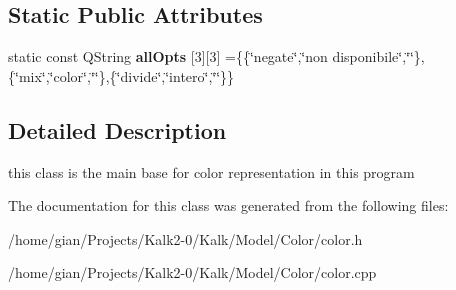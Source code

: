 \subsection*{Static Public Attributes}
\begin{DoxyCompactItemize}
\item 
\mbox{\label{class_color_af49cd7836a808e9e36408f996ea3ce0e}} 
static const Q\+String {\bfseries all\+Opts} \mbox{[}3\mbox{]}\mbox{[}3\mbox{]} =\{\{\char`\"{}negate\char`\"{},\char`\"{}non disponibile\char`\"{},\char`\"{}\char`\"{}\},\{\char`\"{}mix\char`\"{},\char`\"{}color\char`\"{},\char`\"{}\char`\"{}\},\{\char`\"{}divide\char`\"{},\char`\"{}intero\char`\"{},\char`\"{}\char`\"{}\}\}
\end{DoxyCompactItemize}


\subsection{Detailed Description}
this class is the main base for color representation in this program 

The documentation for this class was generated from the following files\+:\begin{DoxyCompactItemize}
\item 
/home/gian/\+Projects/\+Kalk2-\/0/\+Kalk/\+Model/\+Color/color.\+h\item 
/home/gian/\+Projects/\+Kalk2-\/0/\+Kalk/\+Model/\+Color/color.\+cpp\end{DoxyCompactItemize}
